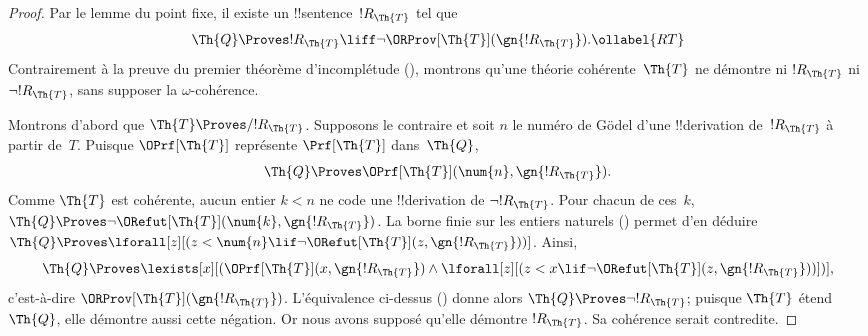 \documentclass[../../../include/open-logic-section]{subfiles}
\begin{document}
\begin{proof}
Par le lemme du point fixe, il existe un
!!{sentence}~$!R_\Th{T}$ tel que
\begin{equation}
\Th{Q}\Proves !R_\Th{T}\liff
\lnot\ORProv[\Th{T}](\gn{!R_\Th{T}}).
\ollabel{RT}
\end{equation}
Contrairement à la preuve du premier théorème
d'incomplétude (),
montrons qu'une théorie cohérente~$\Th{T}$ ne démontre ni
$!R_\Th{T}$ ni $\lnot !R_\Th{T}$, sans supposer
la $\omega$-cohérence.

Montrons d'abord que $\Th{T}\Proves/ !R_{\Th{T}}$.
Supposons le contraire et soit $n$ le numéro de
Gödel d'une !!{derivation} de~$!R_{\Th{T}}$
à partir de~$T$. Puisque $\OPrf[\Th{T}]$
représente $\Prf[\Th{T}]$ dans~$\Th{Q}$,
\[
\Th{Q}\Proves
\OPrf[\Th{T}](\num{n},\gn{!R_{\Th{T}}}).
\]
Comme $\Th{T}$ est cohérente, aucun entier
$k<n$ ne code une !!{derivation} de
$\lnot !R_{\Th{T}}$. Pour chacun de ces~$k$,
$\Th{Q}\Proves\lnot\ORefut[\Th{T}](\num{k},
\gn{!R_{\Th{T}}})$. La borne finie sur les
entiers naturels
() permet d'en
déduire
$\Th{Q}\Proves\lforall[z][(z<\num{n}\lif
\lnot\ORefut[\Th{T}](z,\gn{!R_{\Th{T}}}))]$.
Ainsi,
\[
\Th{Q}\Proves
\lexists[x][(\OPrf[\Th{T}](x,\gn{!R_{\Th{T}}})
\land\lforall[z][(z<x\lif
\lnot\ORefut[\Th{T}](z,\gn{!R_{\Th{T}}}))])],
\]
c'est-à-dire $\ORProv[\Th{T}](\gn{!R_{\Th{T}}})$.
L'équivalence ci-dessus () donne alors
$\Th{Q}\Proves\lnot !R_{\Th{T}}$; puisque
$\Th{T}$ étend~$\Th{Q}$, elle démontre aussi
cette négation. Or nous avons supposé qu'elle
démontre $!R_{\Th{T}}$. Sa cohérence serait
contredite.


\end{proof}
\end{document}
